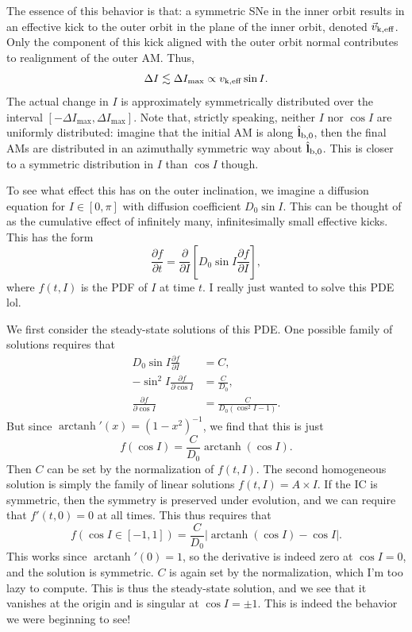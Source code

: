 \documentclass[12pt]{article}
\newcommand*{\pd}[2]{\frac{\partial#1}{\partial#2}}
\newcommand*{\bm}[1]{\boldsymbol{\mathbf{#1}}}
\newcommand*{\uv}[1]{\hat{\bm{#1}}}
\newcommand*{\abs}[1]{\left|#1\right|}
\newcommand*{\p}[1]{\left(#1\right)}
\newcommand*{\s}[1]{\left[#1\right]}
\DeclareMathOperator{\arctanh}{arctanh}
\begin{document}
The essence of this behavior is that: a symmetric SNe in the inner orbit results
in an effective kick to the outer orbit in the plane of the inner orbit, denoted
$\vec{v}_{\rm k, eff}$. Only the component of this kick aligned with the outer
orbit normal contributes to realignment of the outer AM\@. Thus,
\begin{equation}
    \Delta I \lesssim \Delta I_{\max}\propto v_{\rm k, eff}\sin I.
\end{equation}
The actual change in $I$ is approximately symmetrically distributed over the
interval $\s{-\Delta I_{\max}, \Delta I_{\max}}$. Note that, strictly speaking,
neither $I$ nor $\cos I$ are uniformly distributed: imagine that the initial AM
is along $\uv{l}_{\rm b, 0}$, then the final AMs are distributed in an
azimuthally symmetric way about $\uv{l}_{\rm b, 0}$. This is closer to a
symmetric distribution in $I$ than $\cos I$ though.

To see what effect this has on the outer inclination, we imagine a diffusion
equation for $I \in [0, \pi]$ with diffusion coefficient $D_0 \sin I$. This can
be thought of as the cumulative effect of infinitely many, infinitesimally small
effective kicks. This has the form
\begin{equation}
    \pd{f}{t} = \pd{}{I}\s{D_0\sin I\pd{f}{I}},
\end{equation}
where $f(t, I)$ is the PDF of $I$ at time $t$. I really just wanted to solve
this PDE lol.

We first consider the steady-state solutions of this PDE\@. One possible family of
solutions requires that
\begin{align}
    D_0\sin I\pd{f}{I} &= C,\\
    -\sin^2I \pd{f}{\cos I} &= \frac{C}{D_0},\\
    \pd{f}{\cos I} &= \frac{C}{D_0\p{\cos^2 I - 1}}.
\end{align}
But since $\arctanh'(x) = (1 - x^2)^{-1}$, we find that this is just
\begin{equation}
    f(\cos I) = \frac{C}{D_0}\arctanh(\cos I).
\end{equation}
Then $C$ can be set by the normalization of $f(t, I)$. The second homogeneous
solution is simply the family of linear solutions $f(t, I) = A \times I$. If the
IC is symmetric, then the symmetry is preserved under evolution, and we can
require that $f'(t, 0) = 0$ at all times. This thus requires that
\begin{equation}
    f\p{\cos I \in [-1, 1]} = \frac{C}{D_0}\abs{\arctanh(\cos I) - \cos I}.
\end{equation}
This works since $\arctanh'(0) = 1$, so the derivative is indeed zero at $\cos I
= 0$, and the solution is symmetric. $C$ is again set by the normalization,
which I'm too lazy to compute. This is thus the steady-state solution, and we
see that it vanishes at the origin and is singular at $\cos I = \pm 1$. This is
indeed the behavior we were beginning to see!
\end{document}
